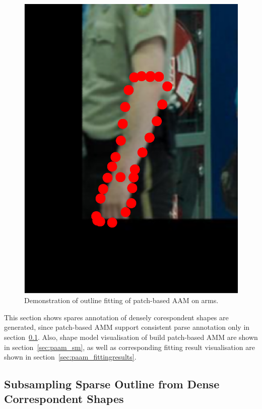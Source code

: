 \begin{figure}[!t]
    \includegraphics[height=\ofh]{Suplementory_Meterial/ExFit/0044.eps}
    
    \caption{Demonstration of outline fitting of patch-based AAM on arms.}
    \label{fig:outline_fitting}
\end{figure}

This section shows spares annotation of densely corespondent shapes are generated, since patch-based AMM support consistent parse annotation only in section~\ref{sec:sparsesample}. Also, shape model visualisation of build patch-based AMM are shown in section~\ref{sec:paam_sm}, as well as corresponding fitting result visualisation are shown in section~\ref{sec:paam_fittingresults}.


\subsection{Subsampling Sparse Outline from Dense Correspondent Shapes}
\label{sec:sparsesample}

